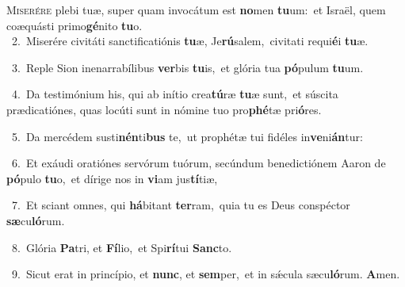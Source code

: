 \lettrine{\initial\textcolor{\initialcolor}{M}}{iserére} plebi tuæ, super quam invocátum est \textbf{no}\-men \textbf{tu}\-um:~\star et Israël, quem coæquásti primo\-\textbf{gé}\-nito \textbf{tu}\-o.\\
{\numbfont\textcolor{\numbcolor}{~2.}}~Miserére civitáti sanctificatiónis \textbf{tu}\-æ, Je\-\textbf{rú}\-salem,~\star civitati requi\-\textbf{é}\-i \textbf{tu}\-æ.\par
{\numbfont\textcolor{\numbcolor}{~3.}}~Reple Sion inenarrabílibus \textbf{ver}\-bis \textbf{tu}\-is,~\star et glória tua \textbf{pó}\-pulum \textbf{tu}\-um.\par
{\numbfont\textcolor{\numbcolor}{~4.}}~Da testimónium his, qui ab inítio crea\-\textbf{tú}\-ræ \textbf{tu}\-æ sunt,~\star et súscita prædicatiónes, quas locúti sunt in nómine tuo pro\-\textbf{phé}\-tæ pri\-\textbf{ó}\-res.\par
{\numbfont\textcolor{\numbcolor}{~5.}}~Da mercédem susti\-\textbf{nén}\-ti\textbf{bus} te,~\star ut prophétæ tui fidéles in\-\textbf{ve}\-ni\-\textbf{án}\-tur:\par
{\numbfont\textcolor{\numbcolor}{~6.}}~Et exáudi oratiónes servórum tuórum, secúndum benedictiónem Aaron de \textbf{pó}\-pulo \textbf{tu}\-o,~\star et dírige nos in \textbf{vi}\-am jus\-\textbf{tí}\-tiæ,\par
{\numbfont\textcolor{\numbcolor}{~7.}}~Et sciant omnes, qui \textbf{há}\-bitant \textbf{ter}\-ram,~\star quia tu es Deus conspéctor \textbf{sæ}\-cu\-\textbf{ló}\-rum.\par
{\numbfont\textcolor{\numbcolor}{~8.}}~Glória \textbf{Pa}\-tri, et \textbf{Fí}\-lio,~\star et Spi\-\textbf{rí}\-tui \textbf{Sanc}\-to.\par
{\numbfont\textcolor{\numbcolor}{~9.}}~Sicut erat in princípio, et \textbf{nunc}\-, et \textbf{sem}\-per,~\star et in sǽcula sæcu\-\textbf{ló}\-rum. \textbf{A}\-men.\par

